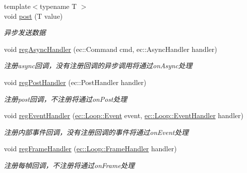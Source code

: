 \begin{DoxyCompactItemize}
{\footnotesize template$<$typename T $>$ }\\void \hyperlink{classec_1_1Loop_ab120f6b96e2dd165a353e4c2d767dc6c}{post} (T value)
\begin{DoxyCompactList}\small\item\em 异步发送数据 \end{DoxyCompactList}\item 
\hypertarget{classec_1_1Loop_a54c8e94f74760c38d0c07c2c7584a1d4}{void \hyperlink{classec_1_1Loop_a54c8e94f74760c38d0c07c2c7584a1d4}{reg\-Async\-Handler} (ec\-::\-Command cmd, ec\-::\-Async\-Handler handler)}\label{classec_1_1Loop_a54c8e94f74760c38d0c07c2c7584a1d4}

\begin{DoxyCompactList}\small\item\em 注册async回调，没有注册回调的异步调用将通过on\-Async处理 \end{DoxyCompactList}\item 
\hypertarget{classec_1_1Loop_aa815829ba034e87209d62958d94c1bf9}{void \hyperlink{classec_1_1Loop_aa815829ba034e87209d62958d94c1bf9}{reg\-Post\-Handler} (ec\-::\-Post\-Handler handler)}\label{classec_1_1Loop_aa815829ba034e87209d62958d94c1bf9}

\begin{DoxyCompactList}\small\item\em 注册post回调，不注册将通过on\-Post处理 \end{DoxyCompactList}\item 
\hypertarget{classec_1_1Loop_a9106028b7c268472a27832fe7812ba7f}{void \hyperlink{classec_1_1Loop_a9106028b7c268472a27832fe7812ba7f}{reg\-Event\-Handler} (\hyperlink{classec_1_1Loop_ac861df4ad2e7779e31932b2171935f81}{ec\-::\-Loop\-::\-Event} event, \hyperlink{classec_1_1Loop_a7c68e22f03ea2b4b670a440291438aed}{ec\-::\-Loop\-::\-Event\-Handler} handler)}\label{classec_1_1Loop_a9106028b7c268472a27832fe7812ba7f}

\begin{DoxyCompactList}\small\item\em 注册内部事件回调，没有注册回调的事件将通过on\-Event处理 \end{DoxyCompactList}\item 
\hypertarget{classec_1_1Loop_a6ad6f4a613cad7f4090c98bb370edac7}{void \hyperlink{classec_1_1Loop_a6ad6f4a613cad7f4090c98bb370edac7}{reg\-Frame\-Handler} (\hyperlink{classec_1_1Loop_aaa0d9bf951a410663fc354e5be062229}{ec\-::\-Loop\-::\-Frame\-Handler} handler)}\label{classec_1_1Loop_a6ad6f4a613cad7f4090c98bb370edac7}

\begin{DoxyCompactList}\small\item\em 注册每幀回调，不注册将通过on\-Frame处理 \end{DoxyCompactList}\end{DoxyCompactItemize}
